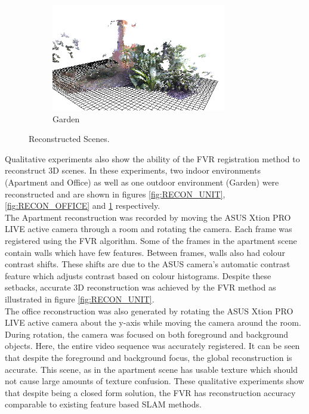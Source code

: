 \begin{figure}[!htb]
\begin{subfigure}[b]{3.0in}
                \includegraphics[width=3.0in]{images/ch2/outdoorA}
                \caption{Garden}
                \label{fig:RECON_GARDEN}
        \end{subfigure}
       \caption{Reconstructed Scenes.}
       \label{fig:RECONSTRUCTIONS}
\end{figure}

Qualitative experiments also show the ability of the FVR registration method to reconstruct 3D scenes. In these experiments, two indoor environments (Apartment and Office) as well as one outdoor environment (Garden) were reconstructed and are shown in figures \ref{fig:RECON_UNIT}, \ref{fig:RECON_OFFICE} and \ref{fig:RECON_GARDEN} respectively. \\

The Apartment reconstruction was recorded by moving the ASUS Xtion PRO LIVE active camera through a room and rotating the camera. Each frame was registered using the FVR algorithm. Some of the frames in the apartment scene contain walls which have few features. Between frames, walls also had colour contrast shifts. These shifts are due to the ASUS camera's automatic contrast feature which adjusts contrast based on colour histograms. Despite these setbacks, accurate 3D reconstruction was achieved by the FVR method as illustrated in figure \ref{fig:RECON_UNIT}. \\


The office reconstruction was also generated by rotating the ASUS Xtion PRO LIVE active camera about the y-axis while moving the camera around the room. During rotation, the camera was focused on both foreground and background objects. Here, the entire video sequence was accurately registered. It can be seen that despite the foreground and background focus, the global reconstruction is accurate. This scene, as in the apartment scene has usable texture which should not cause large amounts of texture confusion. These qualitative experiments show that despite being a closed form solution, the FVR has reconstruction accuracy comparable to existing feature based SLAM methods. \\


